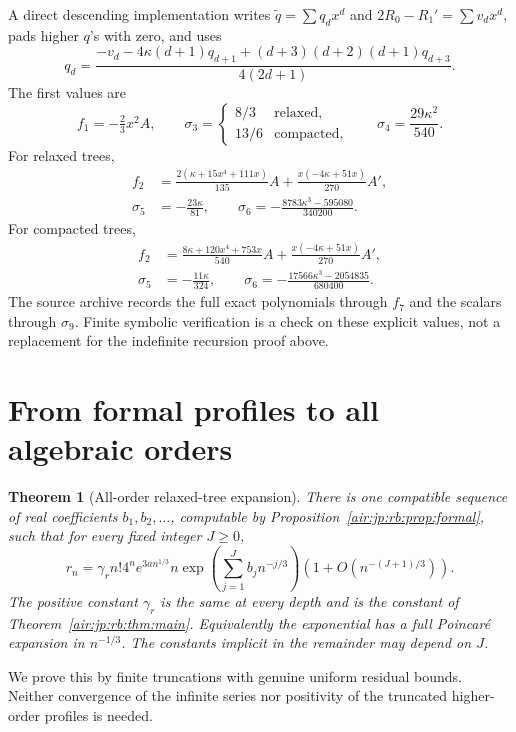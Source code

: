 \documentclass[11pt,letterpaper]{article}
\numberwithin{equation}{section}
\newtheorem{theorem}{Theorem}[section]
\theoremstyle{remark}
\begin{document}
A direct descending implementation writes $\widetilde q=\sum q_dx^d$ and $2R_0-R_1'=\sum v_dx^d$, pads higher $q$'s with zero, and uses
\begin{equation}\label{air:jp:rb:eq:descending}
 q_d=\frac{-v_d-4\kappa(d+1)q_{d+1}+(d+3)(d+2)(d+1)q_{d+3}}{4(2d+1)}.
\end{equation}
The first values are
\[
 f_1=-\tfrac23x^2A,\qquad
 \sigma_3=\begin{cases}8/3&\text{relaxed},\\13/6&\text{compacted},\end{cases}
 \qquad\sigma_4=\frac{29\kappa^2}{540}.
\]
For relaxed trees,
\begin{align*}
 f_2&=\frac{2(\kappa+15x^4+111x)}{135}A
       +\frac{x(-4\kappa+51x)}{270}A',\\
 \sigma_5&=-\frac{23\kappa}{81},\qquad
 \sigma_6=-\frac{8783\kappa^3-595080}{340200}.
\end{align*}
For compacted trees,
\begin{align*}
 f_2&=\frac{8\kappa+120x^4+753x}{540}A
       +\frac{x(-4\kappa+51x)}{270}A',\\
 \sigma_5&=-\frac{11\kappa}{324},\qquad
 \sigma_6=-\frac{17566\kappa^3-2054835}{680400}.
\end{align*}
The source archive records the full exact polynomials through $f_7$ and the scalars through $\sigma_9$. Finite symbolic verification is a check on these explicit values, not a replacement for the indefinite recursion proof above.

\section{From formal profiles to all algebraic orders}\label{air:jp:rb:sec:allorders}

\begin{theorem}[All-order relaxed-tree expansion]\label{air:jp:rb:thm:allorders}
There is one compatible sequence of real coefficients $b_1,b_2,\ldots$, computable by Proposition~\ref{air:jp:rb:prop:formal}, such that for every fixed integer $J\ge0$,
\begin{equation}\label{air:jp:rb:eq:allorders}
 r_n=\gamma_r n!4^ne^{3an^{1/3}}n
 \exp\!\left(\sum_{j=1}^Jb_jn^{-j/3}\right)
 \left(1+O(n^{-(J+1)/3})\right).
\end{equation}
The positive constant $\gamma_r$ is the same at every depth and is the constant of Theorem~\ref{air:jp:rb:thm:main}. Equivalently the exponential has a full Poincar\'e expansion in $n^{-1/3}$. The constants implicit in the remainder may depend on $J$.
\end{theorem}
We prove this by finite truncations with genuine uniform residual bounds. Neither convergence of the infinite series nor positivity of the truncated higher-order profiles is needed.
\end{document}

